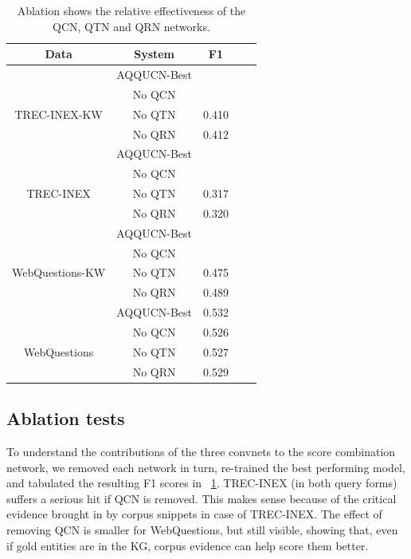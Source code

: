 \documentclass{svjour3}
\begin{document}
\begin{table}[ht]
\centering
\begin{tabular}{| c | c | c | c | c |}
\hline
Data    & System       & F1 \\
\hline
      & AQQUCN-Best  & \cellcolor{green!25}{0.417} \\
      & No QCN  & \cellcolor{red!20}{0.167} \\
TREC-INEX-KW        & No QTN & \cellcolor{red!5}0.410 \\
       & No QRN &  \cellcolor{red!5}0.412 \\
\hline
\hline
      & AQQUCN-Best  & \cellcolor{green!25}{0.323} \\
       &No QCN  & \cellcolor{red!18}{0.192}\\
TREC-INEX       & No QTN & \cellcolor{red!5}0.317 \\
       & No QRN &  \cellcolor{red!5}0.320 \\
\hline
\hline
      & AQQUCN-Best  & \cellcolor{green!25}{0.492} \\
		& No QCN  & \cellcolor{red!5}{0.480}  \\
 WebQuestions-KW        & No QTN & \cellcolor{red!20}0.475 \\
       & No QRN & \cellcolor{red!5}0.489  \\
\hline
\hline
      & AQQUCN-Best  & \cellcolor{green!25}0.532 \\
	& No QCN & \cellcolor{red!5}0.526  \\
WebQuestions          & No QTN & \cellcolor{red!5}0.527 \\
       & No QRN & \cellcolor{red!5}0.529 \\
\hline
\end {tabular}
\caption{Ablation shows the relative effectiveness of the QCN, QTN and QRN networks.}
  \label{fig:convnetBenefits}
\end{table}




\subsection{Ablation tests} \label{sec:corpusevidence}
\label{sec:ablation}

To understand the contributions of the three convnets to the score combination network, we removed each network in turn, re-trained the best performing model, and tabulated the resulting F1 scores in \tablename~\ref{fig:convnetBenefits}.  TREC-INEX (in both query forms) suffers a serious hit if QCN is removed.  This makes sense because of the critical evidence brought in by corpus snippets in case of TREC-INEX.  The effect of removing QCN is smaller for WebQuestions, but still visible, showing that, even if gold entities are in the KG, corpus evidence can help score them better.
\end{document}
